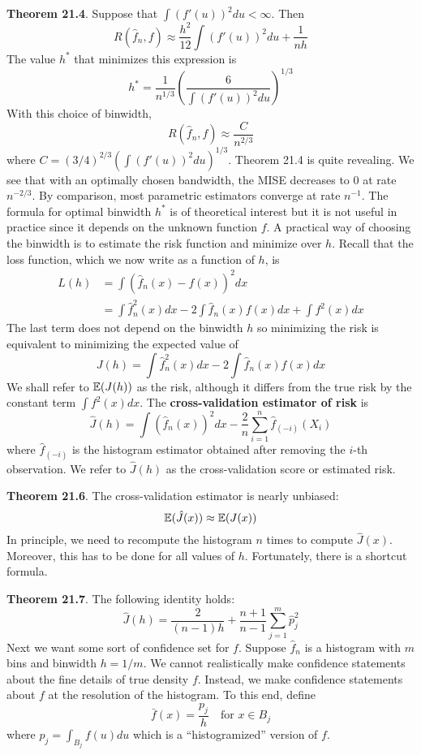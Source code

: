 \textbf{Theorem 21.4}. Suppose that \(\int (f'(u))^{2} du < \infty\). Then
\[
R(\hat{f}_{n}, f) \approx \frac{h^{2}}{12} \int (f'(u))^{2} du + \frac{1}{nh}
\]
The value \(h^{*}\) that minimizes this expression is
\[
h^{*} = \frac{1}{n^{1/3}} \left( \frac{6}{\int (f'(u))^{2} du} \right)^{1/3}
\]
With this choice of binwidth,
\[
R(\hat{f}_{n}, f) \approx \frac{C}{n^{2/3}}
\]
where \(C = (3/4)^{2/3} \left( \int (f'(u))^{2} du \right)^{1/3}\).
Theorem 21.4 is quite revealing. We see that with an optimally chosen bandwidth, the MISE decreases to 0 at rate \(n^{-2/3}\). By comparison, most parametric estimators converge at rate \(n^{-1}\). The formula for optimal binwidth \(h^{*}\) is of theoretical interest but it is not useful in practice since it depends on the unknown function \(f\).
A practical way of choosing the binwidth is to estimate the risk function and minimize over \(h\). Recall that the loss function, which we now write as a function of \(h\), is
\begin{align*}
L(h) &= \int \left( \hat{f}_{n}(x) - f(x) \right)^{2} dx \\
&= \int \hat{f}_{n}^{2}(x) dx - 2 \int \hat{f}_{n}(x) f(x) dx + \int f^{2}(x) dx
\end{align*}
The last term does not depend on the binwidth \(h\) so minimizing the risk is equivalent to minimizing the expected value of
\[
J(h) = \int \hat{f}_{n}^{2}(x) dx - 2 \int \hat{f}_{n}(x) f(x) dx
\]
We shall refer to \(\operatorname{\mathbb{E}}(J(h))\) as the risk, although it differs from the true risk by the constant term \(\int f^{2}(x) dx\).
The \textbf{cross-validation estimator of risk} is
\[
\hat{J}(h) = \int \left( \hat{f}_{n}(x) \right)^{2} dx - \frac{2}{n} \sum_{i=1}^{n} \hat{f}_{(-i)}(X_{i})
\]
where \(\hat{f}_{(-i)}\) is the histogram estimator obtained after removing the \(i\)-th observation. We refer to \(\hat{J}(h)\) as the cross-validation score or estimated risk.

\textbf{Theorem 21.6}. The cross-validation estimator is nearly
unbiased:
\[
\operatorname{\mathbb{E}}(\hat{J}(x)) \approx \operatorname{\mathbb{E}}(J(x))
\]
In principle, we need to recompute the histogram \(n\) times to compute \(\hat{J}(x)\). Moreover, this has to be done for all values of \(h\). Fortunately, there is a shortcut formula.

\textbf{Theorem 21.7}. The following identity holds:
\[
\hat{J}(h) = \frac{2}{(n - 1)h} + \frac{n+1}{n-1} \sum_{j=1}^m \hat{p}_{j}^{2}
\]
Next we want some sort of confidence set for \(f\). Suppose \(\hat{f}_{n}\) is a histogram with \(m\) bins and binwidth \(h = 1 / m\). We cannot realistically make confidence statements about the fine details of true density \(f\). Instead, we make confidence statements about \(f\) at the resolution of the histogram. To this end, define
\[
\bar{f}(x) = \frac{p_{j}}{h} \quad \text{for } x \in B_{j}
\]
where \(p_{j} = \int_{B_{j}} f(u) du\) which is a ``histogramized'' version
of \(f\).

